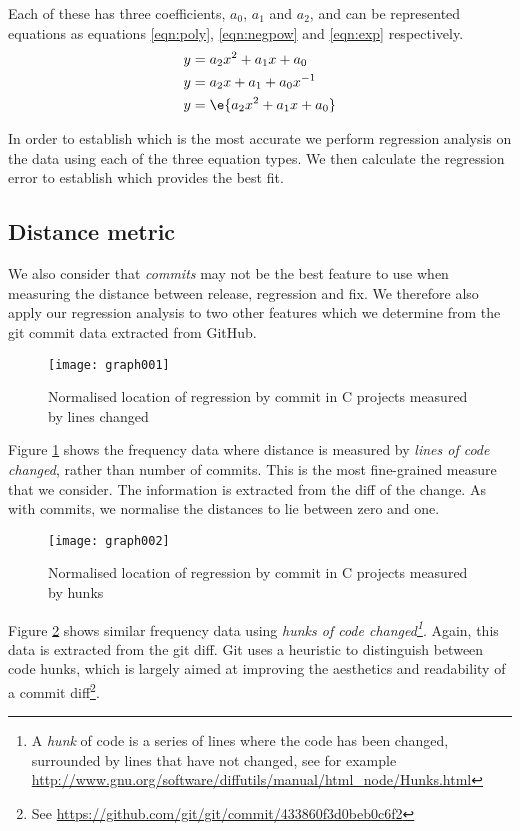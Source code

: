 \documentclass[10pt,journal,compsoc]{IEEEtran}
\begin{document}
Each of these has three coefficients, $a_0$, $a_1$ and $a_2$, and can be represented equations as equations \ref{eqn:poly}, \ref{eqn:negpow} and \ref{eqn:exp} respectively.
\begin{align}
y &= a_2 x^2 + a_1 x + a_0 \label{eqn:poly} \\
y &= a_2 x + a_1 + a_0 x^{-1} \label{eqn:negpow} \\
y &= \e{a_2 x^2 + a_1 x + a_0} \label{eqn:exp}
\end{align}

In order to establish which is the most accurate we perform regression analysis on the data using each of the three equation types. We then calculate the regression error to establish which provides the best fit.

\subsection{Distance metric}

We also consider that {\it commits\/} may not be the best feature to use when measuring the distance between release, regression and fix. We therefore also apply our regression analysis to two other features which we determine from the git commit data extracted from GitHub.

\begin{figure}[t]
\centering
\texttt{[image: graph001]}%
\caption{\label{fig:c-lines}Normalised location of regression by commit in C projects measured by lines changed}
\end{figure}

Figure \ref{fig:c-lines} shows the frequency data where distance is measured by {\it lines of code changed}, rather than number of commits. This is the most fine-grained measure that we consider. The information is extracted from the diff of the change. As with commits, we normalise the distances to lie between zero and one.

\begin{figure}[t]
\centering
\texttt{[image: graph002]}%
\caption{\label{fig:c-blocks}Normalised location of regression by commit in C projects measured by hunks}
\end{figure}

Figure \ref{fig:c-blocks} shows similar frequency data using {\it hunks of code changed\footnote{A {\it hunk\/} of code is a series of lines where the code has been changed, surrounded by lines that have not changed, see for example \url{http://www.gnu.org/software/diffutils/manual/html_node/Hunks.html}}}. Again, this data is extracted from the git diff. Git uses a heuristic to distinguish between code hunks, which is largely aimed at improving the aesthetics and readability of a commit diff\footnote{See \url{https://github.com/git/git/commit/433860f3d0beb0c6f2}}.
\end{document}
